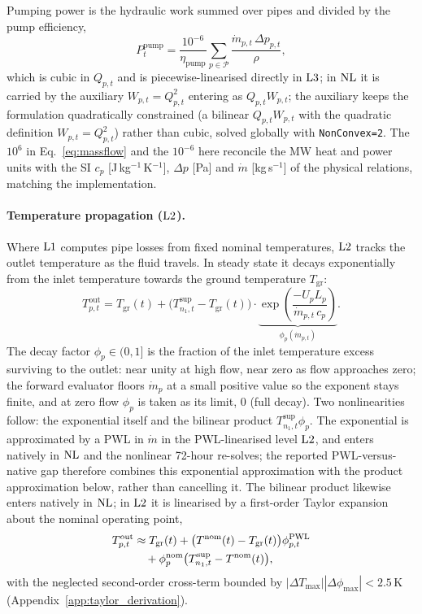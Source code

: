 Pumping power is the hydraulic work summed over pipes and divided by the pump efficiency,
%
\begin{equation}
  P_t^{\mathrm{pump}} = \frac{10^{-6}}{\eta_{\mathrm{pump}}}
    \sum_{p \in \mathcal{P}}
    \frac{\dot{m}_{p,t}\, \Delta p_{p,t}}{\rho},
  \label{eq:pump_power}
\end{equation}
%
which is cubic in $Q_{p,t}$ and is piecewise-linearised directly in $\mathrm{L3}$; in $\mathrm{NL}$
it is carried by the auxiliary $W_{p,t} = Q_{p,t}^2$ entering as $Q_{p,t} W_{p,t}$; the
auxiliary keeps the formulation quadratically constrained (a bilinear $Q_{p,t}W_{p,t}$ with the
quadratic definition $W_{p,t}=Q_{p,t}^2$) rather than cubic, solved globally with
\texttt{NonConvex=2}. The $10^{6}$ in
Eq.~\eqref{eq:massflow} and the $10^{-6}$ here reconcile the MW heat and power units with the
SI $c_p$ [J\,kg$^{-1}$\,K$^{-1}$], $\Delta p$ [Pa] and $\dot m$ [kg\,s$^{-1}$] of the physical
relations, matching the implementation.

\paragraph{Temperature propagation ($\mathrm{L2}$).}
Where $\mathrm{L1}$ computes pipe losses from fixed nominal temperatures, $\mathrm{L2}$ tracks the
outlet temperature as the fluid travels. In steady state it decays exponentially from the
inlet temperature towards the ground temperature $T_{\mathrm{gr}}$:
%
\begin{equation}
  T_{p,t}^{\mathrm{out}} = T_{\mathrm{gr}}(t)
    + \bigl(T_{n_1,t}^{\mathrm{sup}} - T_{\mathrm{gr}}(t)\bigr)
    \cdot \underbrace{\exp\!\left(
      \frac{-U_p L_p}{\dot{m}_{p,t}\, c_p}
    \right)}_{\displaystyle\phi_p(\dot{m}_{p,t})}.
  \label{eq:temp_prop}
\end{equation}
%
The decay factor $\phi_p \in (0,1]$ is the fraction of the inlet temperature excess
surviving to the outlet: near unity at high flow, near zero as flow approaches zero; the
forward evaluator floors $\dot{m}_p$ at a small positive value so the exponent stays finite,
and at zero flow $\phi_p$ is taken as its limit, $0$ (full decay). Two
nonlinearities follow: the exponential itself and the bilinear product
$T_{n_1,t}^{\mathrm{sup}} \phi_p$. The exponential is approximated by a PWL in $\dot{m}$ in the
PWL-linearised level $\mathrm{L2}$, and enters natively in $\mathrm{NL}$ and the nonlinear 72-hour re-solves; the
reported PWL-versus-native gap therefore combines this exponential approximation with the
product approximation below, rather than cancelling it. The bilinear product likewise enters
natively in $\mathrm{NL}$; in $\mathrm{L2}$ it is linearised by a first-order Taylor expansion about the
nominal operating point,
%
\begin{align}
  T_{p,t}^{\mathrm{out}} &\approx T_{\mathrm{gr}}(t)
    + \bigl(T^{\mathrm{nom}}(t) - T_{\mathrm{gr}}(t)\bigr)
      \phi_{p,t}^{\mathrm{PWL}} \notag \\
    &\quad + \phi_p^{\mathrm{nom}}
      \bigl(T_{n_1,t}^{\mathrm{sup}} - T^{\mathrm{nom}}(t)\bigr),
  \label{eq:temp_prop_lin}
\end{align}
%
with the neglected second-order cross-term bounded by
$|\Delta T_{\max}||\Delta\phi_{\max}| < 2.5$\,K (Appendix~\ref{app:taylor_derivation}).

